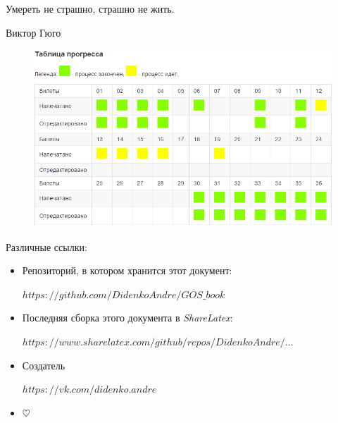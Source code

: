 \epigraph{Умереть не страшно, страшно не жить.}{Виктор Гюго}

\begin{figure}[h!]
\includegraphics[width=\textwidth]{pictures/progress}
\end{figure}

\mbox{}

Различные ссылки:
\begin{itemize}
\item

Репозиторий, в котором хранится этот документ:

\href{https://github.com/DidenkoAndre/GOS_book}{$https://github.com/DidenkoAndre/GOS\_book$}

\item
Последняя сборка этого документа в \textit{ShareLatex}: 

\href{https://www.sharelatex.com/github/repos/DidenkoAndre/GOS_book/builds/c0e14fc7c81d27d1206c8f73f078a8cd347bc1ec/raw/output.pdf}{$https://www.sharelatex.com/github/repos/DidenkoAndre/...$}

\item
Создатель

\href{https://vk.com/didenko.andre}{$https://vk.com/didenko.andre$}

\item

$\heartsuit$
\end{itemize}


